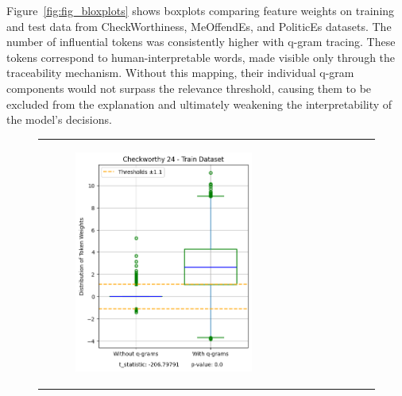 \documentclass[runningheads,10pt]{llncs}
\begin{document}
Figure~\ref{fig:fig_bloxplots} shows boxplots comparing feature weights on training and test data from CheckWorthiness, MeOffendEs, and PoliticEs datasets. The number of influential tokens was consistently higher with q-gram tracing. These tokens correspond to human-interpretable words, made visible only through the traceability mechanism. Without this mapping, their individual q-gram components would not surpass the relevance threshold, causing them to be excluded from the explanation and ultimately weakening the interpretability of the model's decisions. 

\begin{figure}[t]
    \flushleft
    \captionsetup{skip=2pt}
    \begin{tabular}{c c c}
        \begin{subfigure}{0.32\textwidth}
            \centering
            \includegraphics[width=\linewidth]{fig_checkworthy_24_train.png}
            \label{fig:image1}
        \end{subfigure} &
        \begin{subfigure}{0.32\textwidth}

\end{subfigure}
\end{tabular}
\end{figure}
\end{document}
